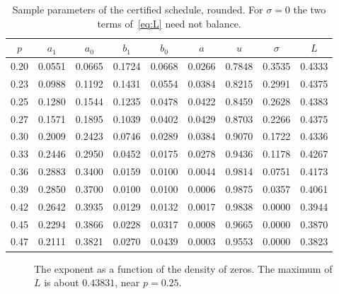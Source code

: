 \documentclass[11pt]{article}
\theoremstyle{remark}
\begin{document}
\begin{table}[h]
\centering
\small
\begin{tabular}{@{}ccccccccc@{}}
\toprule
$p$ & $a_1$ & $a_0$ & $b_1$ & $b_0$ & $a$ & $u$ & $\sigma$ & $L$\\
\midrule
0.20 & 0.0551 & 0.0665 & 0.1724 & 0.0668 & 0.0266 & 0.7848 & 0.3535 & 0.4333\\
0.23 & 0.0988 & 0.1192 & 0.1431 & 0.0554 & 0.0384 & 0.8215 & 0.2991 & 0.4375\\
0.25 & 0.1280 & 0.1544 & 0.1235 & 0.0478 & 0.0422 & 0.8459 & 0.2628 & 0.4383\\
0.27 & 0.1571 & 0.1895 & 0.1039 & 0.0402 & 0.0429 & 0.8703 & 0.2266 & 0.4375\\
0.30 & 0.2009 & 0.2423 & 0.0746 & 0.0289 & 0.0384 & 0.9070 & 0.1722 & 0.4336\\
0.33 & 0.2446 & 0.2950 & 0.0452 & 0.0175 & 0.0278 & 0.9436 & 0.1178 & 0.4267\\
0.36 & 0.2883 & 0.3400 & 0.0159 & 0.0100 & 0.0044 & 0.9814 & 0.0751 & 0.4173\\
0.39 & 0.2850 & 0.3700 & 0.0100 & 0.0100 & 0.0006 & 0.9875 & 0.0357 & 0.4061\\
0.42 & 0.2642 & 0.3935 & 0.0129 & 0.0132 & 0.0017 & 0.9838 & 0.0000 & 0.3944\\
0.45 & 0.2294 & 0.3866 & 0.0228 & 0.0317 & 0.0008 & 0.9665 & 0.0000 & 0.3870\\
0.47 & 0.2111 & 0.3821 & 0.0270 & 0.0439 & 0.0003 & 0.9553 & 0.0000 & 0.3823\\
\bottomrule
\end{tabular}
\caption{Sample parameters of the certified schedule, rounded. For $\sigma=0$ the two terms of~\eqref{eq:L} need not balance.}
\label{tab:params}
\end{table}

\begin{figure}[h]
\centering
{}
\caption{The exponent as a function of the density of zeros. The maximum of $L$ is about $0.43831$, near $p=0.25$.}
\label{fig:curves}
\end{figure}
\end{document}
